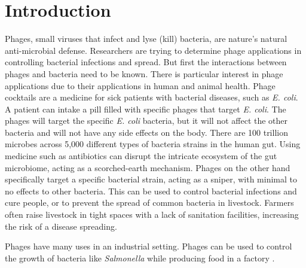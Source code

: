 \chapter{Introduction}
\label{Introduction}

Phages, small viruses that infect and lyse (kill) bacteria, are nature's natural anti-microbial defense. 
Researchers are trying to determine phage applications in controlling bacterial infections and spread. 
But first the interactions between phages and bacteria need to be known. 
There is particular interest in phage applications due to their applications in human and animal health. 
Phage cocktails are a medicine for sick patients with bacterial diseases, such as \textit{E. coli}. 
A patient can intake a pill filled with specific phages that target \textit{E. coli}.
The phages will target the specific \textit{E. coli} bacteria, but it will not affect the other bacteria and will not have any side effects on the body. 
There are 100 trillion microbes across 5,000 different types of bacteria strains in the human gut. 
Using medicine such as antibiotics can disrupt the intricate ecosystem of the gut microbiome, acting as a scorched-earth mechanism. 
Phages on the other hand specifically target a specific bacterial strain, acting as a sniper, with minimal to no effects to other bacteria. 
This can be used to control bacterial infections and cure people, or to prevent the spread of common bacteria in livestock. 
Farmers often raise livestock in tight spaces with a lack of sanitation facilities, increasing the risk of a disease spreading. \newline 

Phages have many uses in an industrial setting. 
Phages can be used to control the growth of bacteria like \textit{Salmonella} while producing food in a factory \cite{sofferBacteriophagesSafelyReduce2016, kowalskaFreshVegetablesFruit2023}. 

